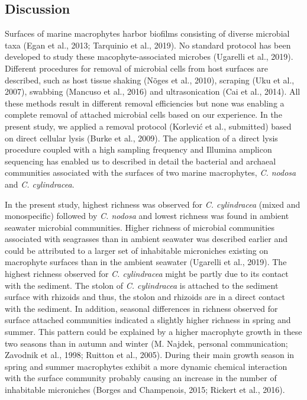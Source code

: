 \documentclass[
  12pt,
]{article}
\begin{document}
\newpage

\hypertarget{discussion}{%
\subsection{Discussion}\label{discussion}}

Surfaces of marine macrophytes harbor biofilms consisting of diverse
microbial taxa (Egan et al., 2013; Tarquinio et al., 2019). No standard
protocol has been developed to study these macophyte-associated microbes
(Ugarelli et al., 2019). Different procedures for removal of microbial
cells from host surfaces are described, such as host tissue shaking
(Nõges et al., 2010), scraping (Uku et al., 2007), swabbing (Mancuso et
al., 2016) and ultrasonication (Cai et al., 2014). All these methods
result in different removal efficiencies but none was enabling a
complete removal of attached microbial cells based on our experience. In
the present study, we applied a removal protocol (Korlević et al.,
submitted) based on direct cellular lysis (Burke et al., 2009). The
application of a direct lysis procedure coupled with a high sampling
frequency and Illumina amplicon sequencing has enabled us to described
in detail the bacterial and archaeal communities associated with the
surfaces of two marine macrophytes, \emph{C. nodosa} and \emph{C.
cylindracea}.

In the present study, highest richness was observed for \emph{C.
cylindracea} (mixed and monospecific) followed by \emph{C. nodosa} and
lowest richness was found in ambient seawater microbial communities.
Higher richness of microbial communities associated with seagrasses than
in ambient seawater was described earlier and could be attributed to a
larger set of inhabitable microniches existing on macrophyte surfaces
than in the ambient seawater (Ugarelli et al., 2019). The highest
richness observed for \emph{C. cylindracea} might be partly due to its
contact with the sediment. The stolon of \emph{C. cylindracea} is
attached to the sediment surface with rhizoids and thus, the stolon and
rhizoids are in a direct contact with the sediment. In addition,
seasonal differences in richness observed for surface attached
communities indicated a slightly higher richness in spring and summer.
This pattern could be explained by a higher macrophyte growth in these
two seasons than in autumn and winter (M. Najdek, personal
communication; Zavodnik et al., 1998; Ruitton et al., 2005). During
their main growth season in spring and summer macrophytes exhibit a more
dynamic chemical interaction with the surface community probably causing
an increase in the number of inhabitable microniches (Borges and
Champenois, 2015; Rickert et al., 2016).
\end{document}
